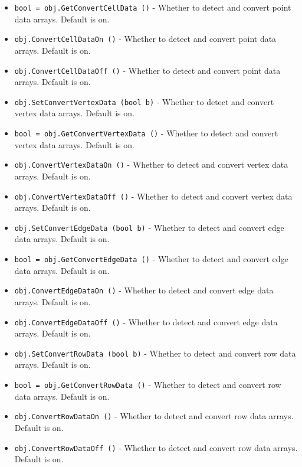 \begin{itemize}
\item  \verb|bool = obj.GetConvertCellData ()| -  Whether to detect and convert point data arrays.  Default is on.

\item  \verb|obj.ConvertCellDataOn ()| -  Whether to detect and convert point data arrays.  Default is on.

\item  \verb|obj.ConvertCellDataOff ()| -  Whether to detect and convert point data arrays.  Default is on.

\item  \verb|obj.SetConvertVertexData (bool b)| -  Whether to detect and convert vertex data arrays.  Default is on.

\item  \verb|bool = obj.GetConvertVertexData ()| -  Whether to detect and convert vertex data arrays.  Default is on.

\item  \verb|obj.ConvertVertexDataOn ()| -  Whether to detect and convert vertex data arrays.  Default is on.

\item  \verb|obj.ConvertVertexDataOff ()| -  Whether to detect and convert vertex data arrays.  Default is on.

\item  \verb|obj.SetConvertEdgeData (bool b)| -  Whether to detect and convert edge data arrays.  Default is on.

\item  \verb|bool = obj.GetConvertEdgeData ()| -  Whether to detect and convert edge data arrays.  Default is on.

\item  \verb|obj.ConvertEdgeDataOn ()| -  Whether to detect and convert edge data arrays.  Default is on.

\item  \verb|obj.ConvertEdgeDataOff ()| -  Whether to detect and convert edge data arrays.  Default is on.

\item  \verb|obj.SetConvertRowData (bool b)| -  Whether to detect and convert row data arrays.  Default is on.

\item  \verb|bool = obj.GetConvertRowData ()| -  Whether to detect and convert row data arrays.  Default is on.

\item  \verb|obj.ConvertRowDataOn ()| -  Whether to detect and convert row data arrays.  Default is on.

\item  \verb|obj.ConvertRowDataOff ()| -  Whether to detect and convert row data arrays.  Default is on.

\end{itemize}
